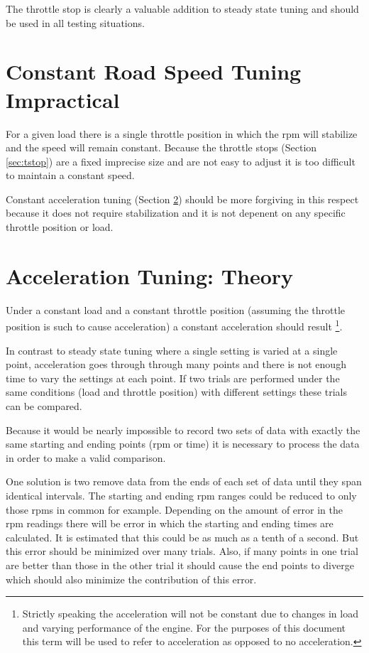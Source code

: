 \documentclass{article}
\begin{document}
The throttle stop is clearly a valuable addition to steady
state tuning and should be used in all testing situations.

\section{Constant Road Speed Tuning Impractical}

For a given load there is a single throttle position in which
the rpm will stabilize and the speed will remain constant.
Because the throttle stops (Section \ref{sec:tstop}) are a fixed
imprecise size and are not easy to adjust it is too difficult
to maintain a constant speed.

Constant acceleration tuning (Section \ref{sec:conacc})
should be more forgiving in this respect because it does not require
stabilization and it is not depenent on any specific throttle position
or load.

\section{Acceleration Tuning: Theory}
\label{sec:conacc}

Under a constant load and a constant throttle position
(assuming the throttle position is such to cause acceleration)
a constant acceleration should result
\footnote{Strictly speaking the acceleration will not be constant due to
changes in load and varying performance of the engine.
For the purposes of this document this term will be used to
refer to acceleration as opposed to no acceleration.}.

In contrast to steady state tuning where a single setting is varied
at a single point, acceleration goes through through many points
and there is not enough time to vary the settings at each point.
If two trials are performed under the same conditions (load and throttle
position) with different settings these trials can be compared.

Because it would be nearly impossible to record two sets of data with
exactly the same starting and ending points (rpm or time) it
is necessary to process the data in order to make a valid comparison.

One solution is two remove data from the ends of each set of data until
they span identical intervals.
The starting and ending rpm ranges could be reduced to only those rpms
in common for example.
Depending on the amount of error in the rpm readings there will be error
in which the starting and ending times are calculated.
It is estimated that this could be as much as a tenth of a second.
But this error should be minimized over many trials.
Also, if many points in one trial are better than those in the other
trial it should cause the end points to diverge which should also minimize
the contribution of this error.
\end{document}
